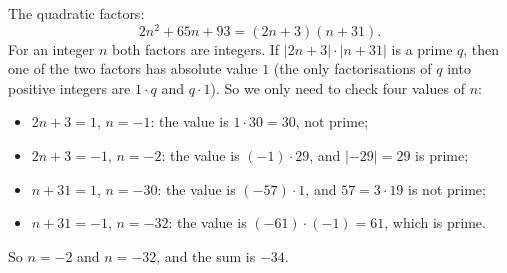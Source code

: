 The quadratic factors:
\[2n^2+65n+93=(2n+3)(n+31).\]
For an integer $n$ both factors are integers. If $|2n+3|\cdot|n+31|$ is a prime $q$, then one of the two factors has absolute value $1$ (the only factorisations of $q$ into positive integers are $1\cdot q$ and $q\cdot1$). So we only need to check four values of $n$:
\begin{itemize}
\item $2n+3=1$, $n=-1$: the value is $1\cdot30=30$, not prime;
\item $2n+3=-1$, $n=-2$: the value is $(-1)\cdot29$, and $|-29|=29$ is prime;
\item $n+31=1$, $n=-30$: the value is $(-57)\cdot1$, and $57=3\cdot19$ is not prime;
\item $n+31=-1$, $n=-32$: the value is $(-61)\cdot(-1)=61$, which is prime.
\end{itemize}
So $n=-2$ and $n=-32$, and the sum is $\boxed{-34}$.
